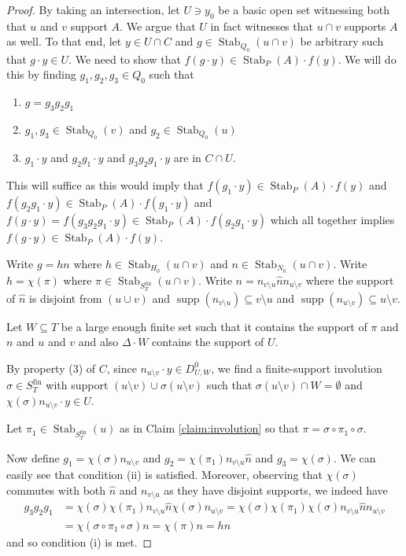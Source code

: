\documentclass[12pt]{amsart}
\theoremstyle{plain}
\theoremstyle{definition}
\newcommand{\fin}{\text{fin}}
\DeclareMathOperator{\supp}{supp}
\DeclareMathOperator{\Stab}{Stab}
\begin{document}
\begin{proof}
By taking an intersection, let $U \ni y_0$ be a basic open set witnessing both that $u$ and $v$ support $A$.
We argue that $U$ in fact witnesses that $u \cap v$ supports $A$ as well.
To that end, let $y \in U \cap C$ and $g \in \Stab_{Q_0}(u \cap v)$ be arbitrary such that $g \cdot y \in U$.
We need to show that $f(g \cdot y) \in \Stab_P(A) \cdot f(y)$.
We will do this by finding $g_1, g_2, g_3 \in Q_0$ such that 
\begin{enumerate}
\item[(i)] $g = g_3g_2g_1$
\item[(ii)] $g_1, g_3 \in \Stab_{Q_0}(v)$ and $g_2 \in \Stab_{Q_0}(u)$
\item[(iii)] $g_1 \cdot y$ and $g_2g_1 \cdot y$ and $g_3g_2g_1\cdot y$ are in $C \cap U$.
\end{enumerate}
This will suffice as this would imply that $f(g_1 \cdot y)
 \in \Stab_P(A) \cdot f(y)$ and $f(g_2g_1 \cdot y) \in \Stab_P(A) \cdot f(g_1 \cdot y)$ and $f(g \cdot y) = f(g_3g_2g_1 \cdot y) \in \Stab_P(A) \cdot f(g_2g_1 \cdot y)$ which all together implies $f(g \cdot y) \in \Stab_P(A) \cdot f(y)$.

Write $g = hn$ where $h \in \Stab_{H_0}(u \cap v)$ and $n \in \Stab_{N_0}(u \cap v)$.
Write $h = \chi(\pi)$ where $\pi \in \Stab_{S_T^\fin}(u \cap v)$.
Write $n =  n_{v \setminus u} \hat{n} n_{u \setminus v}$ where the support of $\hat{n}$ is disjoint from $(u \cup v)$ and $\supp(n_{v \setminus u}) \subseteq v \setminus u$ and $\supp(n_{u \setminus v}) \subseteq u \setminus v$.

Let $W \subseteq T$ be a large enough finite set such that it contains the support of $\pi$ and $n$ and $u$ and $v$ and also $\Delta \cdot W$ contains the support of $U$.

By property (3) of $C$, since $n_{u \setminus v} \cdot y \in D^0_{U, W}$, we find a finite-support involution $\sigma \in S^\fin_T$ with support $(u \setminus v) \cup \sigma(u \setminus v)$ such that $\sigma(u \setminus v) \cap W = \emptyset$ and $\chi(\sigma) n_{u \setminus v} \cdot y \in U$.

Let $\pi_1 \in \Stab_{S_T^\fin}(u)$ as in Claim \ref{claim:involution} so that $\pi = \sigma \circ \pi_1 \circ \sigma$.

Now define $g_1 = \chi(\sigma) n_{u \setminus v}$ and $g_2 = \chi(\pi_1) n_{v \setminus u} \hat{n}$ and $g_3 = \chi(\sigma)$.
We can easily see that condition (ii) is satisfied.
Moreover, observing that $\chi(\sigma)$ commutes with both $\hat{n}$ and $n_{v \setminus u}$ as they have disjoint supports, we indeed have
\begin{align*}
g_3g_2g_1 &= \chi(\sigma)\chi(\pi_1) n_{v \setminus u}\hat{n} \chi(\sigma) n_{u \setminus v} = \chi(\sigma)\chi(\pi_1)  \chi(\sigma) n_{v \setminus u}\hat{n} n_{u \setminus v}\\
&= \chi(\sigma \circ \pi_1 \circ \sigma) n = \chi(\pi) n = h n
\end{align*}
and so condition (i) is met.


\end{proof}
\end{document}
